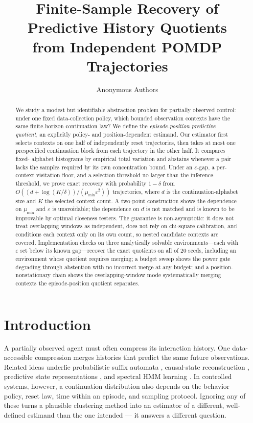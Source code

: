 \documentclass{article}
\title{Finite-Sample Recovery of Predictive History Quotients\\from Independent POMDP Trajectories}
\author{Anonymous Authors}
\newcommand{\eps}{\varepsilon}
\begin{document}
\maketitle

\begin{abstract}
We study a modest but identifiable abstraction problem for partially observed
control: under one fixed data-collection policy, which bounded observation
contexts have the same finite-horizon continuation law?  We define the
\emph{episode-position predictive quotient}, an explicitly policy- and
position-dependent estimand.  Our estimator first selects contexts on one
half of independently reset trajectories, then takes at most one prespecified
continuation block from each trajectory in the other half.  It compares fixed-
alphabet histograms by empirical total variation and abstains whenever a pair
lacks the samples required by its own concentration bound.  Under an
$\eps$-gap, a per-context visitation floor, and a selection threshold no
larger than the inference threshold, we prove exact recovery with
probability $1-\delta$ from
$O((d+\log(K/\delta))/(\mu_{\min}\eps^2))$ trajectories, where $d$ is the
continuation-alphabet size and $K$ the selected context count.  A two-point
construction shows the dependence on $\mu_{\min}$ and $\eps$ is unavoidable;
the dependence on $d$ is not matched and is known to be improvable by
optimal closeness testers.
The guarantee is non-asymptotic: it does not treat overlapping windows as
independent, does not rely on chi-square calibration, and conditions each
context only on its own count, so nested candidate contexts are covered.
Implementation checks on three analytically solvable environments---each
with $\eps$ set below its known gap---recover the exact quotients on all of
20 seeds, including an environment whose quotient requires merging; a
budget sweep shows the power gate degrading through abstention with no
incorrect merge at any budget; and a position-nonstationary chain shows the
overlapping-window mode systematically merging contexts the
episode-position quotient separates.
\end{abstract}

\section{Introduction}

A partially observed agent must often compress its interaction history.  One
data-accessible compression merges histories that predict the same future
observations.  Related ideas underlie probabilistic suffix automata
\citep{ron1996power}, causal-state reconstruction \citep{shalizi2004blind},
predictive state representations \citep{boots2010closing}, and spectral HMM
learning \citep{hsu2012spectral}.  In controlled systems, however, a
continuation distribution also depends on the behavior policy, reset law,
time within an episode, and sampling protocol.  Ignoring any of these turns
a plausible clustering method into an estimator of a different, well-defined
estimand than the one intended --- it answers a different question.
\end{document}
